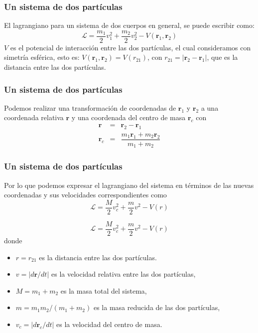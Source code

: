 \begin{frame}
\frametitle{Un sistema de dos partículas}
El lagrangiano para un sistema de dos cuerpos en general, se puede escribir como:
\[ \mathcal{L} = \dfrac{m_{1}}{2} v_{1}^{2} + \dfrac{m_{2}}{2} v_{2}^{2} - V(\mathbf{r}_{1},\mathbf{r}_2)\]
$V$ es el potencial de interacción entre las dos partículas, el cual consideramos con simetría esférica, esto es: $V(\mathbf{r}_{1},\mathbf{r}_{2}) = V(r_{21})$, con $r_{21} = \vert \mathbf{r}_{2} - \mathbf{r}_{1} \vert$, que es la distancia entre las dos partículas.
\end{frame}
\begin{frame}
\frametitle{Un sistema de dos partículas}
Podemos realizar una transformación de coordenadas de $\mathbf{r}_{1}$ y $\mathbf{r}_{2}$ a una coordenada relativa $\mathbf{r}$ y una coordenada del centro de masa $\mathbf{r}_{c}$ con
\begin{eqnarray}
\mathbf{r} &=& \mathbf{r}_{2} - \mathbf{r}_{1} \\
\mathbf{r}_{c} &=& \dfrac{m_{1}\mathbf{r}_{1} + m_{2} \mathbf{r}_{2}}{m_{1} + m_{2}}
\end{eqnarray}
\end{frame}
\begin{frame}
\frametitle{Un sistema de dos partículas}
Por lo que podemos expresar el lagrangiano del sistema en términos de las nuevas coordenadas y sus velocidades correspondientes como
\begin{equation}
\mathcal{L} = \dfrac{M}{2} v_{c}^{2} + \dfrac{m}{2} v^{2} - V(r)
\end{equation}
\end{frame}
\begin{frame}[fragile]
\[ \mathcal{L} = \dfrac{M}{2} v_{c}^{2} + \dfrac{m}{2} v^{2} - V(r)\]
donde
\begin{itemize}[<+->]
\item [\textcolor{red}{\checkmark}] $r=r_{21}$ es la distancia entre las dos partículas.
\item [\textcolor{red}{\checkmark}] $v= \vert d\mathbf{r}/dt \vert$ es la velocidad relativa entre las dos partículas,
\item [\textcolor{red}{\checkmark}] $M = m_{1} + m_{2}$ es la masa total del sistema,
\item [\textcolor{red}{\checkmark}] $m = m_{1}m_{2}/(m_{1}+m_{2})$ es la masa reducida de las dos partículas,
\item [\textcolor{red}{\checkmark}] $v_{c} = \vert d\mathbf{r}_{c}/dt \vert$ es la velocidad del centro de masa.
\end{itemize}
\end{frame}
